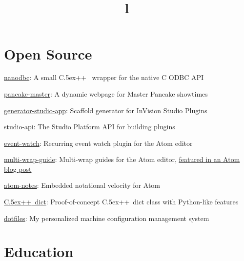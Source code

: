 \documentclass[12pt, tweaklist, line]{res}
\let\tempone\itemize
\let\temptwo\enditemize
\renewenvironment{itemize}{\tempone\vspace{-.15in}\setlength{\topsep}{0pt}\setlength{\itemsep}{3pt}\vspace{-.15in}}{\temptwo}
\def\Cplusplus{{\rm C\raise.5ex\hbox{\small ++}}}
\begin{document}
\begin{resume}
\vspace{-.08in}
\section{Open Source}
\begin{itemize}
\vspace{.55in} %
\item \href{http://nanodbc.io}{nanodbc}: A small \Cplusplus~ wrapper for the native C ODBC API
\item \href{http://pancake.lexicalunit.com}{pancake-master}: A dynamic webpage for Master Pancake showtimes
\item \href{https://www.npmjs.com/package/generator-studio-app}{generator-studio-app}: Scaffold generator for InVision Studio Plugins
\item \href{https://www.npmjs.com/package/@invisionapp/studio-api}{studio-api}: The Studio Platform API for building plugins
\item \href{https://atom.io/packages/event-watch}{event-watch}: Recurring event watch plugin for the Atom editor
\item \href{https://atom.io/packages/multi-wrap-guide}{multi-wrap-guide}: Multi-wrap guides for the Atom editor, \href{http://blog.atom.io/2015/08/06/new-package-roundup.html}{featured in an Atom blog post}
\item \href{https://github.com/lexicalunit/atom-notes}{atom-notes}: Embedded notational velocity for Atom
\item \href{https://github.com/lexicalunit/dict}{\Cplusplus~dict}: Proof-of-concept \Cplusplus~dict class with Python-like features
\item \href{https://github.com/lexicalunit/dotfiles}{dotfiles}: My personalized machine configuration management system
\end{itemize}

\section{Education}
\begin{format}
  \\
  \title{l}\\
  \body\\
\end{format}


\end{resume}
\end{document}
